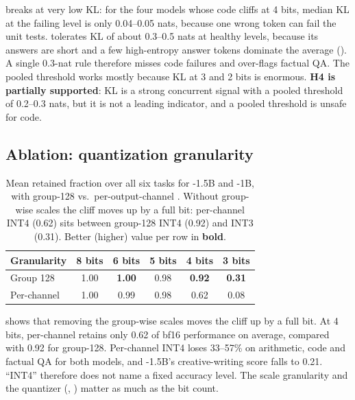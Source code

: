 \humaneval breaks at very low KL: for the four models whose code cliffs at 4 bits, median KL at the failing level is only 0.04--0.05 nats, because one wrong token can fail the unit tests. \trivia tolerates KL of about 0.3--0.5 nats at healthy levels, because its answers are short and a few high-entropy answer tokens dominate the average (). A single 0.3-nat rule therefore misses code failures and over-flags factual QA. The pooled threshold works mostly because KL at 3 and 2 bits is enormous. \textbf{H4 is partially supported}: KL is a strong concurrent signal with a pooled threshold of 0.2--0.3 nats, but it is not a leading indicator, and a pooled threshold is unsafe for code.

\subsection{Ablation: quantization granularity}
\label{sec:granularity}

\begin{table}[t]
\centering
\caption{Mean retained fraction over all six tasks for \qwen-1.5B and \llama-1B, with group-128 vs.\ per-output-channel \rtn. Without group-wise scales the cliff moves up by a full bit: per-channel INT4 (0.62) sits between group-128 INT4 (0.92) and INT3 (0.31). Better (higher) value per row in \textbf{bold}.}
\label{tab:granularity}
\begin{tabular}{@{}lccccc@{}}
\toprule
\textbf{Granularity} & \textbf{8 bits} & \textbf{6 bits} & \textbf{5 bits} & \textbf{4 bits} & \textbf{3 bits} \\
\midrule
Group 128 & 1.00 & \textbf{1.00} & 0.98 & \textbf{0.92} & \textbf{0.31} \\
Per-channel & 1.00 & 0.99 & 0.98 & 0.62 & 0.08 \\
\bottomrule
\end{tabular}
\end{table}

 shows that removing the group-wise scales moves the cliff up by a full bit. At 4 bits, per-channel \rtn retains only 0.62 of bf16 performance on average, compared with 0.92 for group-128. Per-channel INT4 loses 33--57\% on arithmetic, code and factual QA for both models, and \qwen-1.5B's creative-writing score falls to 0.21. ``INT4'' therefore does not name a fixed accuracy level. The scale granularity and the quantizer (, \awq) matter as much as the bit count.
